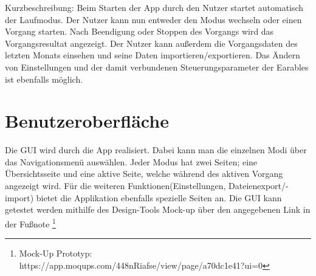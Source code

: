 \documentclass[a4paper,12pt]{article}
\begin{document}
Kurzbeschreibung: Beim Starten der App durch den Nutzer startet automatisch der Laufmodus. Der Nutzer kann nun entweder den Modus wechseln oder einen \Gls{Vorgang} starten. Nach Beendigung oder Stoppen des Vorgangs wird das Vorgangsresultat angezeigt. Der Nutzer kann außerdem die Vorgangsdaten des letzten Monats einsehen und seine Daten importieren/exportieren. Das Ändern von Einstellungen und der damit verbundenen \Gls{Steuerungsparameter} der \Gls{Earables} ist ebenfalls möglich.
\section{Benutzeroberfläche}
Die \Gls{GUI} wird durch die App realisiert. Dabei kann man die einzelnen Modi über das Navigationsmenü auswählen. Jeder Modus hat zwei Seiten; eine Übersichtsseite und eine aktive Seite, welche während des aktiven \Gls{Vorgang} angezeigt wird. Für die weiteren Funktionen(Einstellungen, Dateienexport/-import) bietet die Applikation ebenfalls spezielle Seiten an.
Die \Gls{GUI} kann getestet werden mithilfe des Design-Tools \glqq Mock-up\grqq{} über den angegebenen Link in der Fußnote \footnote[1]{Mock-Up Prototyp: https://app.moqups.com/448nRiafse/view/page/a70dc1e41?ui=0}
\end{document}
